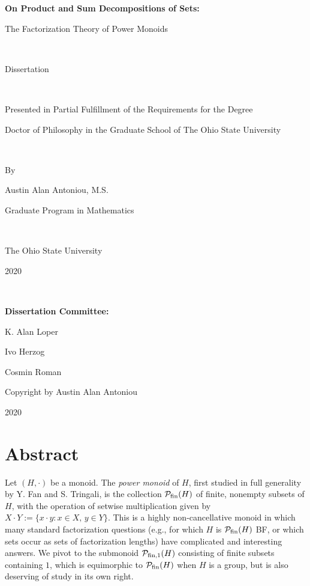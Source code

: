 \frontmatter

\begin{titlepage}
\hspace{0pt}
\vfill
\begin{center}
	{\LARGE \bf On Product and Sum Decompositions of Sets: \\ \vspace{3mm}
		
		The Factorization Theory of Power Monoids}

\

	Dissertation

\
	
	Presented in Partial Fulfillment of the Requirements 
	for the Degree 
	
	Doctor of Philosophy 
	in the Graduate School of The Ohio State University

\
		
	By 
	
	{\large Austin Alan Antoniou, M.S. 
	
	Graduate Program in Mathematics}

\
	
	The Ohio State University
	
	2020

\

	{\large {\bf Dissertation Committee:}
	
	K. Alan Loper
	
	Ivo Herzog
	
	Cosmin Roman}
\end{center}
\vfill
\end{titlepage}

\newpage

\hspace{0pt}
\vfill
\begin{center}
{\Large Copyright by Austin Alan Antoniou

2020}
\end{center}
\setcounter{page}{1}
\vfill
\thispagestyle{empty}
\chapter{Abstract}
Let $(H,\cdot)$ be a monoid.
The \textit{power monoid} of $H$, first studied in full generality by Y. Fan and S. Tringali, is the collection $\mathcal{P}_{\textrm{fin}}(H)$ of finite, nonempty subsets of $H$, with the operation of setwise multiplication given by $X\cdot Y := \{x\cdot y: x\in X, \, y\in Y\}$.
This is a highly non-cancellative monoid in which many standard factorization questions (e.g., for which $H$ is $\mathcal{P}_{\textrm{fin}}(H)$ BF, or which sets occur as sets of factorization lengths) have complicated and interesting answers.
We pivot to the submonoid $\mathcal{P}_{\textrm{fin}, 1}(H)$ consisting of finite subsets containing $1$, which is equimorphic to $\mathcal{P}_{\textrm{fin}}(H)$ when $H$ is a group, but is also deserving of study in its own right.


